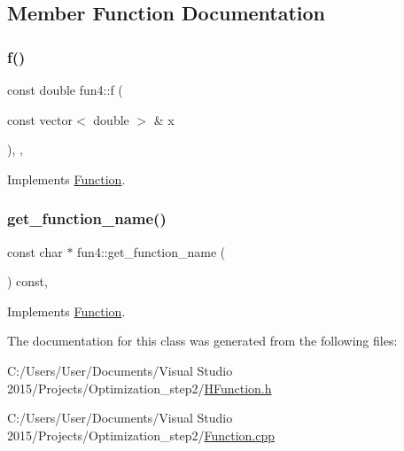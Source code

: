 \subsection{Member Function Documentation}
\mbox{\label{classfun4_a3b693cb223f26fb733381d601751eb5c}} 
\subsubsection{\texorpdfstring{f()}{f()}}
{\footnotesize\ttfamily const double fun4\+::f (\begin{DoxyParamCaption}\item[{const vector$<$ double $>$ \&}]{x }\end{DoxyParamCaption})\hspace{0.3cm}{\ttfamily [inline]}, {\ttfamily [override]}, {\ttfamily [virtual]}}



Implements \hyperlink{class_function_ae700c7cb44bd2048d712466767be2803}{Function}.

\mbox{\label{classfun4_a8f28df4800e2e572cf60d2d02e299100}} 
\subsubsection{\texorpdfstring{get\+\_\+function\+\_\+name()}{get\_function\_name()}}
{\footnotesize\ttfamily const char $\ast$ fun4\+::get\+\_\+function\+\_\+name (\begin{DoxyParamCaption}{ }\end{DoxyParamCaption}) const\hspace{0.3cm}{\ttfamily [override]}, {\ttfamily [virtual]}}



Implements \hyperlink{class_function_a928c579622c47d98e91477ef18dec199}{Function}.



The documentation for this class was generated from the following files\+:\begin{DoxyCompactItemize}
\item 
C\+:/\+Users/\+User/\+Documents/\+Visual Studio 2015/\+Projects/\+Optimization\+\_\+step2/\hyperlink{_h_function_8h}{H\+Function.\+h}\item 
C\+:/\+Users/\+User/\+Documents/\+Visual Studio 2015/\+Projects/\+Optimization\+\_\+step2/\hyperlink{_function_8cpp}{Function.\+cpp}\end{DoxyCompactItemize}
